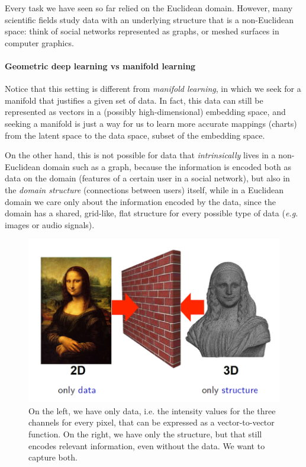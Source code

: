 
Every task we have seen so far relied on the Euclidean domain. However, many scientific fields study data with an underlying structure that is a non-Euclidean space: think of social networks represented as graphs, or meshed surfaces in computer graphics.

\paragraph{Geometric deep learning vs manifold learning}

Notice that this setting is different from \emph{manifold learning}, in which we seek for a manifold that justifies a given set of data. In fact, this data can still be represented as vectors in a (possibly high-dimensional) embedding space, and seeking a manifold is just a way for us to learn more accurate mappings (charts) from the latent space to the data space, subset of the embedding space. 

On the other hand, this is not possible for data that \emph{intrinsically} lives in a non-Euclidean domain such as a graph, because the information is encoded both as data on the domain (features of a certain user in a social network), but also in the \emph{domain structure} (connections between users) itself, while in a Euclidean domain we care only about the information encoded by the data, since the domain has a shared, grid-like, flat structure for every possible type of data (\textit{e.g.} images or audio signals).

\begin{figure}[H]
    \centering
    \includegraphics[width=.7\textwidth]{figures/12/monalisa-domain.png}
    \caption{On the left, we have only data, i.e. the intensity values for the three channels for every pixel, that can be expressed as a vector-to-vector function. On the right, we have only the structure, but that still encodes relevant information, even without the data. We want to capture both.}
\end{figure}

